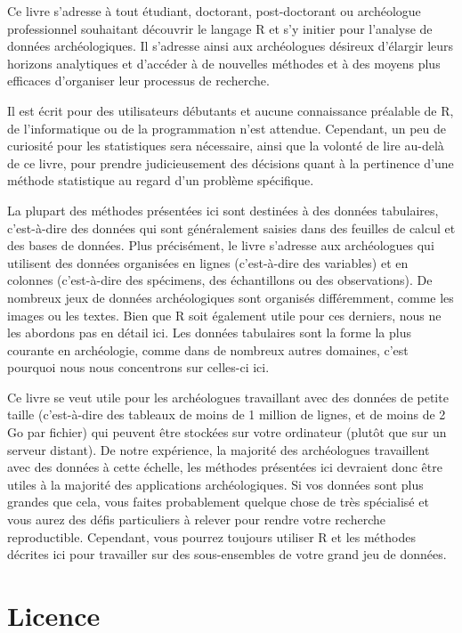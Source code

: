 \documentclass[
  french,
]{scrbook}
\begin{document}
Ce livre s'adresse à tout étudiant, doctorant, post-doctorant ou archéologue professionnel souhaitant découvrir le langage R et s'y initier pour l'analyse de données archéologiques. Il s'adresse ainsi aux archéologues désireux d'élargir leurs horizons analytiques et d'accéder à de nouvelles méthodes et à des moyens plus efficaces d'organiser leur processus de recherche.

Il est écrit pour des utilisateurs débutants et aucune connaissance préalable de R, de l'informatique ou de la programmation n'est attendue. Cependant, un peu de curiosité pour les statistiques sera nécessaire, ainsi que la volonté de lire au-delà de ce livre, pour prendre judicieusement des décisions quant à la pertinence d'une méthode statistique au regard d'un problème spécifique.

La plupart des méthodes présentées ici sont destinées à des données tabulaires, c'est-à-dire des données qui sont généralement saisies dans des feuilles de calcul et des bases de données. Plus précisément, le livre s'adresse aux archéologues qui utilisent des données organisées en lignes (c'est-à-dire des variables) et en colonnes (c'est-à-dire des spécimens, des échantillons ou des observations). De nombreux jeux de données archéologiques sont organisés différemment, comme les images ou les textes. Bien que R soit également utile pour ces derniers, nous ne les abordons pas en détail ici. Les données tabulaires sont la forme la plus courante en archéologie, comme dans de nombreux autres domaines, c'est pourquoi nous nous concentrons sur celles-ci ici.

Ce livre se veut utile pour les archéologues travaillant avec des données de petite taille (c'est-à-dire des tableaux de moins de 1 million de lignes, et de moins de 2 Go par fichier) qui peuvent être stockées sur votre ordinateur (plutôt que sur un serveur distant). De notre expérience, la majorité des archéologues travaillent avec des données à cette échelle, les méthodes présentées ici devraient donc être utiles à la majorité des applications archéologiques. Si vos données sont plus grandes que cela, vous faites probablement quelque chose de très spécialisé et vous aurez des défis particuliers à relever pour rendre votre recherche reproductible. Cependant, vous pourrez toujours utiliser R et les méthodes décrites ici pour travailler sur des sous-ensembles de votre grand jeu de données.

\hypertarget{licence}{%
\section*{Licence}\label{licence}}
\end{document}

